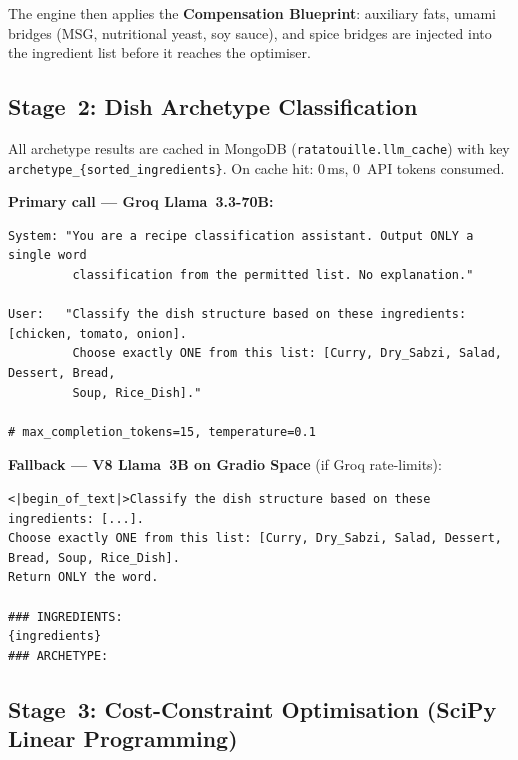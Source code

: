 \documentclass[12pt, a4paper]{article}
\begin{document}
\noindent The engine then applies the \textbf{Compensation Blueprint}: auxiliary fats, umami
bridges (MSG, nutritional yeast, soy sauce), and spice bridges are injected into the ingredient
list before it reaches the optimiser.

\subsection{Stage~2: Dish Archetype Classification}

All archetype results are cached in MongoDB (\texttt{ratatouille.llm\_cache}) with key
\texttt{archetype\_\{sorted\_ingredients\}}.  On cache hit: 0\,ms, 0~API tokens consumed.

\noindent\textbf{Primary call --- Groq Llama~3.3-70B:}
\begin{lstlisting}[style=text, caption={Groq archetype classification prompt.}]
System: "You are a recipe classification assistant. Output ONLY a single word
         classification from the permitted list. No explanation."

User:   "Classify the dish structure based on these ingredients: [chicken, tomato, onion].
         Choose exactly ONE from this list: [Curry, Dry_Sabzi, Salad, Dessert, Bread,
         Soup, Rice_Dish]."

# max_completion_tokens=15, temperature=0.1
\end{lstlisting}

\noindent\textbf{Fallback --- V8 Llama~3B on Gradio Space} (if Groq rate-limits):
\begin{lstlisting}[style=text, caption={Gradio fallback classification prompt.}]
<|begin_of_text|>Classify the dish structure based on these ingredients: [...].
Choose exactly ONE from this list: [Curry, Dry_Sabzi, Salad, Dessert, Bread, Soup, Rice_Dish].
Return ONLY the word.

### INGREDIENTS:
{ingredients}
### ARCHETYPE:

\end{lstlisting}

\subsection{Stage~3: Cost-Constraint Optimisation (SciPy Linear Programming)}
\label{sec:linprog}
\end{document}
